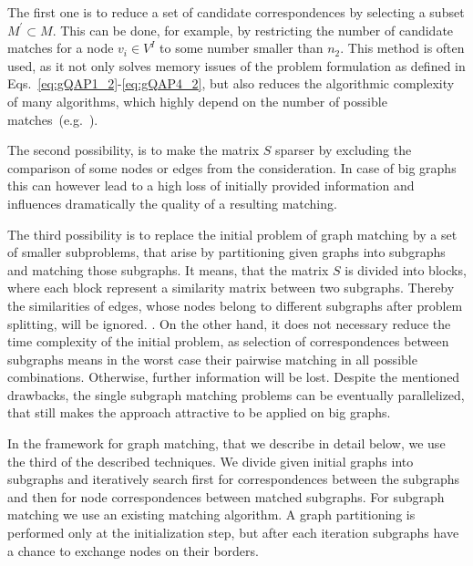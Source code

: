 The first one is to reduce a set of candidate correspondences by selecting a subset $M^\prime\subset M$. This can be done, for example, by restricting the number of candidate matches for a node $v_i\in V^I$ to some number smaller than $n_2$. This method is often used, as it not only solves memory issues of the problem formulation as defined in Eqs.~\eqref{eq:gQAP1_2}-\eqref{eq:gQAP4_2}, but also reduces the algorithmic complexity of many algorithms, which highly depend on the number of possible matches~(e.g.~\cite{Cho2014_Haystack,Cho2010_RRWM,Cho2012_ProgressiveGM, Leordeanu2005_SM}).

The second possibility, is to make the matrix $S$ sparser by excluding the comparison of some nodes or edges from the consideration. In case of big graphs this can however lead to a high loss of initially provided information and influences dramatically the quality of a resulting matching. 

The third possibility is to replace the initial problem of graph matching by a set of smaller subproblems, that arise by partitioning given graphs into subgraphs and matching those subgraphs. It means, that the matrix $S$ is divided into blocks, where each block represent a similarity matrix between two subgraphs. Thereby the similarities of edges, whose nodes belong to different subgraphs after problem splitting, will be ignored. . On the other hand, it does not necessary reduce the time complexity of the initial problem, as selection of correspondences between subgraphs means in the worst case their pairwise matching in all possible combinations. Otherwise, further information will be lost. Despite the mentioned drawbacks, the single subgraph matching problems can be eventually parallelized, that still makes the approach attractive to be applied on big graphs.

In the framework for graph matching, that we describe in detail below, we use the third of the described techniques. We divide given initial graphs into subgraphs and iteratively search first for correspondences between the subgraphs and then for node correspondences between matched subgraphs. For subgraph matching we use an existing matching algorithm. A graph partitioning is performed only at the initialization step, but after each iteration subgraphs have a chance to exchange nodes on their borders.

